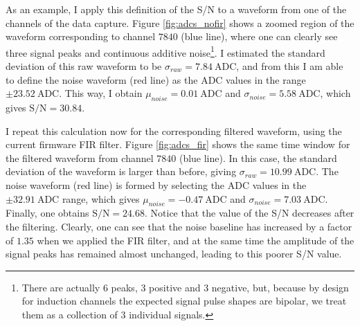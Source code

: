 As an example, I apply this definition of the S/N to a waveform from one of the channels of the data capture. Figure \ref{fig:adcs_nofir} shows a zoomed region of the waveform corresponding to channel $7840$ (blue line), where one can clearly see three signal peaks and continuous additive noise\footnote{There are actually 6 peaks, 3 positive and 3 negative, but, because by design for induction channels the expected signal pulse shapes are bipolar, we treat them as a collection of 3 individual signals.}. I estimated the standard deviation of this raw waveform to be $\sigma_{raw} = 7.84 ~ \mathrm{ADC}$, and from this I am able to define the noise waveform (red line) as the ADC values in the range $\pm 23.52 ~ \mathrm{ADC}$. This way, I obtain $\mu_{noise} = 0.01 ~ \mathrm{ADC}$ and $\sigma_{noise} = 5.58 ~ \mathrm{ADC}$, which gives $\mathrm{S/N} = 30.84$.

I repeat this calculation now for the corresponding filtered waveform, using the current firmware FIR filter. Figure \ref{fig:adcs_fir} shows the same time window for the filtered waveform from channel $7840$ (blue line). In this case, the standard deviation of the waveform is larger than before, giving $\sigma_{raw} = 10.99 ~ \mathrm{ADC}$. The noise waveform (red line) is formed by selecting the ADC values in the $\pm 32.91 ~ \mathrm{ADC}$ range, which gives $\mu_{noise} = -0.47 ~ \mathrm{ADC}$ and $\sigma_{noise} = 7.03 ~ \mathrm{ADC}$. Finally, one obtains $\mathrm{S/N} = 24.68$. Notice that the value of the S/N decreases after the filtering. Clearly, one can see that the noise baseline has increased by a factor of $1.35$ when we applied the FIR filter, and at the same time the amplitude of the signal peaks has remained almost unchanged, leading to this poorer S/N value.

